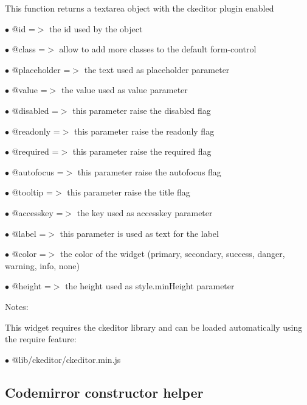\documentclass[a4paper]{book}
\begin{document}
This function returns a textarea object with the ckeditor plugin enabled

\begin{compactitem}
\item[\color{myblue}$\bullet$] @id          =$>$ the id used by the object
\item[\color{myblue}$\bullet$] @class       =$>$ allow to add more classes to the default form-control
\item[\color{myblue}$\bullet$] @placeholder =$>$ the text used as placeholder parameter
\item[\color{myblue}$\bullet$] @value       =$>$ the value used as value parameter
\item[\color{myblue}$\bullet$] @disabled    =$>$ this parameter raise the disabled flag
\item[\color{myblue}$\bullet$] @readonly    =$>$ this parameter raise the readonly flag
\item[\color{myblue}$\bullet$] @required    =$>$ this parameter raise the required flag
\item[\color{myblue}$\bullet$] @autofocus   =$>$ this parameter raise the autofocus flag
\item[\color{myblue}$\bullet$] @tooltip     =$>$ this parameter raise the title flag
\item[\color{myblue}$\bullet$] @accesskey   =$>$ the key used as accesskey parameter
\item[\color{myblue}$\bullet$] @label       =$>$ this parameter is used as text for the label
\item[\color{myblue}$\bullet$] @color       =$>$ the color of the widget (primary, secondary, success, danger, warning, info, none)
\item[\color{myblue}$\bullet$] @height      =$>$ the height used as style.minHeight parameter
\end{compactitem}

Notes:

This widget requires the ckeditor library and can be loaded automatically using the require
feature:

\begin{compactitem}
\item[\color{myblue}$\bullet$] @lib/ckeditor/ckeditor.min.js
\end{compactitem}

\hypertarget{toc470}{}
\subsection{Codemirror constructor helper}
\end{document}
